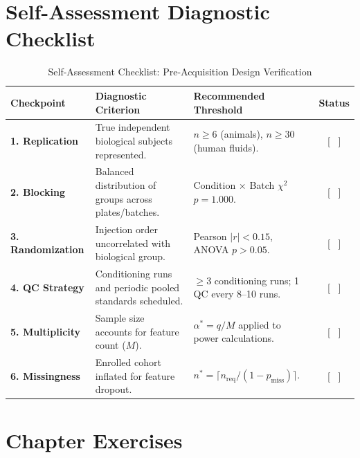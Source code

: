 \documentclass[11pt,twoside,openright]{book}
\begin{document}
\section{Self-Assessment Diagnostic Checklist}

\begin{table}[ht]
\centering
\caption{Self-Assessment Checklist: Pre-Acquisition Design Verification}
\label{tab:checklist}
\small
\begin{tabularx}{\textwidth}{l p{5.5cm} X c}
\toprule
\textbf{Checkpoint} & \textbf{Diagnostic Criterion} & \textbf{Recommended Threshold} & \textbf{Status} \\
\midrule
\textbf{1. Replication} & True independent biological subjects represented. & $n \ge 6$ (animals), $n \ge 30$ (human fluids). & [ \ ] \\
\addlinespace
\textbf{2. Blocking} & Balanced distribution of groups across plates/batches. & Condition $\times$ Batch $\chi^2$ $p = 1.000$. & [ \ ] \\
\addlinespace
\textbf{3. Randomization} & Injection order uncorrelated with biological group. & Pearson $|r| < 0.15$, ANOVA $p > 0.05$. & [ \ ] \\
\addlinespace
\textbf{4. QC Strategy} & Conditioning runs and periodic pooled standards scheduled. & $\ge 3$ conditioning runs; 1 QC every 8--10 runs. & [ \ ] \\
\addlinespace
\textbf{5. Multiplicity} & Sample size accounts for feature count ($M$). & $\alpha^* = q / M$ applied to power calculations. & [ \ ] \\
\addlinespace
\textbf{6. Missingness} & Enrolled cohort inflated for feature dropout. & $n^* = \lceil n_{\text{req}} / (1 - p_{\text{miss}}) \rceil$. & [ \ ] \\
\bottomrule
\end{tabularx}
\end{table}

\FloatBarrier

\section{Chapter Exercises}
\end{document}
